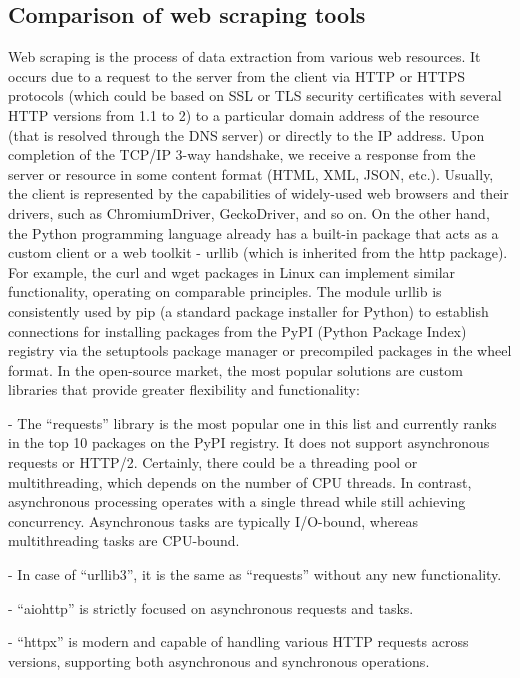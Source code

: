 \subsection{Comparison of web scraping tools} %
Web scraping is the process of data extraction from various web resources. It occurs due to a request to the server from the client via HTTP or HTTPS protocols (which could be based on SSL or TLS security certificates with several HTTP versions from 1.1 to 2) to a particular domain address of the resource (that is resolved through the DNS server) or directly to the IP address. Upon completion of the TCP/IP 3-way handshake, we receive a response from the server or resource in some content format (HTML, XML, JSON, etc.). Usually, the client is represented by the capabilities of widely-used web browsers and their drivers, such as ChromiumDriver, GeckoDriver, and so on. On the other hand, the Python programming language already has a built-in package that acts as a custom client or a web toolkit - urllib (which is inherited from the http package). For example, the curl and wget packages in Linux can implement similar functionality, operating on comparable principles. The module urllib is consistently used by pip (a standard package installer for Python) to establish connections for installing packages from the PyPI (Python Package Index) registry via the setuptools package manager or precompiled packages in the wheel format. In the open-source market, the most popular solutions are custom libraries that provide greater flexibility and functionality:

- The ``requests'' library is the most popular one in this list and currently ranks in the top 10 packages on the PyPI registry. It does not support asynchronous requests or HTTP/2. Certainly, there could be a threading pool or multithreading, which depends on the number of CPU threads. In contrast, asynchronous processing operates with a single thread while still achieving concurrency. Asynchronous tasks are typically I/O-bound, whereas multithreading tasks are CPU-bound.

- In case of ``urllib3'', it is the same as ``requests'' without any new functionality.

- ``aiohttp'' is strictly focused on asynchronous requests and tasks.

- ``httpx'' is modern and capable of handling various HTTP requests across versions, supporting both asynchronous and synchronous operations.

